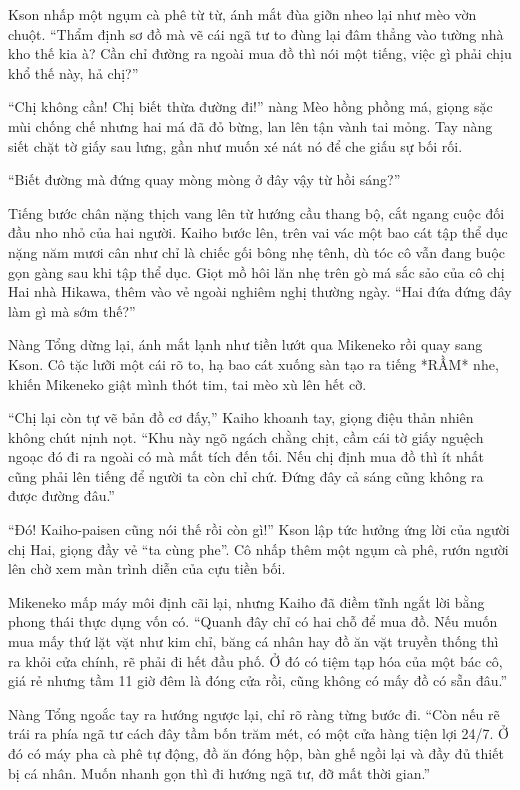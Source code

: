 ﻿\documentclass[../main.tex]{subfiles}
\begin{document}
Kson nhấp một ngụm cà phê từ từ, ánh mắt đùa giỡn nheo lại như mèo vờn chuột. ``Thẩm định sơ đồ mà vẽ cái ngã tư to đùng lại đâm thẳng vào tường nhà kho thế kia à? Cần chỉ đường ra ngoài mua đồ thì nói một tiếng, việc gì phải chịu khổ thế này, hả chị?''

``Chị không cần! Chị biết thừa đường đi!'' nàng Mèo hồng phồng má, giọng sặc mùi chống chế nhưng hai má đã đỏ bừng, lan lên tận vành tai mỏng. Tay nàng siết chặt tờ giấy sau lưng, gần như muốn xé nát nó để che giấu sự bối rối.

``Biết đường mà đứng quay mòng mòng ở đây vậy từ hồi sáng?''

Tiếng bước chân nặng thịch vang lên từ hướng cầu thang bộ, cắt ngang cuộc đối đầu nho nhỏ của hai người. Kaiho bước lên, trên vai vác một bao cát tập thể dục nặng năm mươi cân như chỉ là chiếc gối bông nhẹ tênh, dù tóc cô vẫn đang buộc gọn gàng sau khi tập thể dục. Giọt mồ hôi lăn nhẹ trên gò má sắc sảo của cô chị Hai nhà Hikawa, thêm vào vẻ ngoài nghiêm nghị thường ngày. ``Hai đứa đứng đây làm gì mà sớm thế?''

Nàng Tổng dừng lại, ánh mắt lạnh như tiền lướt qua Mikeneko rồi quay sang Kson. Cô tặc lưỡi một cái rõ to, hạ bao cát xuống sàn tạo ra tiếng *RẦM* nhe, khiến Mikeneko giật mình thót tim, tai mèo xù lên hết cỡ.

``Chị lại còn tự vẽ bản đồ cơ đấy,'' Kaiho khoanh tay, giọng điệu thản nhiên không chút nịnh nọt. ``Khu này ngõ ngách chằng chịt, cầm cái tờ giấy nguệch ngoạc đó đi ra ngoài có mà mất tích đến tối. Nếu chị định mua đồ thì ít nhất cũng phải lên tiếng để người ta còn chỉ chứ. Đứng đây cả sáng cũng không ra được đường đâu.''

``Đó! Kaiho-paisen cũng nói thế rồi còn gì!'' Kson lập tức hưởng ứng lời của người chị Hai, giọng đầy vẻ ``ta cùng phe''. Cô nhấp thêm một ngụm cà phê, rướn người lên chờ xem màn trình diễn của cựu tiền bối.

Mikeneko mấp máy môi định cãi lại, nhưng Kaiho đã điềm tĩnh ngắt lời bằng phong thái thực dụng vốn có. ``Quanh đây chỉ có hai chỗ để mua đồ. Nếu muốn mua mấy thứ lặt vặt như kim chỉ, băng cá nhân hay đồ ăn vặt truyền thống thì ra khỏi cửa chính, rẽ phải đi hết đầu phố. Ở đó có tiệm tạp hóa của một bác cô, giá rẻ nhưng tầm 11 giờ đêm là đóng cửa rồi, cũng không có mấy đồ có sẵn đâu.''

Nàng Tổng ngoắc tay ra hướng ngược lại, chỉ rõ ràng từng bước đi. ``Còn nếu rẽ trái ra phía ngã tư cách đây tầm bốn trăm mét, có một cửa hàng tiện lợi 24/7. Ở đó có máy pha cà phê tự động, đồ ăn đóng hộp, bàn ghế ngồi lại và đầy đủ thiết bị cá nhân. Muốn nhanh gọn thì đi hướng ngã tư, đỡ mất thời gian.''
\end{document}
